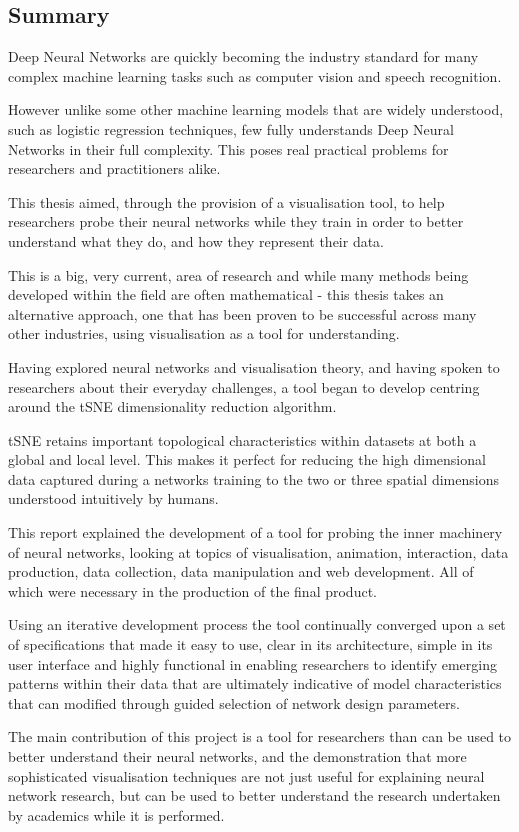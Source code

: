 \documentclass[a4paper,11pt,titlepage]{article}
\begin{document}
\subsection{Summary}
Deep Neural Networks are quickly becoming the industry standard for many complex machine learning tasks such as computer vision and speech recognition.
\par 
However unlike some other machine learning models that are widely understood, such as logistic regression techniques, few fully understands Deep Neural Networks in their full complexity. This poses real practical problems for researchers and practitioners alike.
\par 
This thesis aimed, through the provision of a visualisation tool, to help researchers probe their neural networks while they train in order to better understand what they do, and how they represent their data.
\par 
This is a big, very current, area of research and while many methods being developed within the field are often mathematical - this thesis takes an alternative approach, one that has been proven to be successful across many other industries, using visualisation as a tool for understanding.
\par 
Having explored neural networks and visualisation theory, and having spoken to researchers about their everyday challenges, a tool began to develop centring around the tSNE dimensionality reduction algorithm.
\par 
tSNE retains important topological characteristics within datasets at both a global and local level. This makes it perfect for reducing the high dimensional data captured during a networks training to the two or three spatial dimensions understood intuitively by humans. 
\par 
This report explained the development of a tool for probing the inner machinery of neural networks, looking at topics of visualisation, animation, interaction, data production, data collection, data manipulation and web development. All of which were necessary in the production of the final product.
\par 
Using an iterative development process the tool continually converged upon a set of specifications that made it easy to use, clear in its architecture, simple in its user interface and highly functional in enabling researchers to identify emerging patterns within their data that are ultimately indicative of model characteristics that can modified through guided selection of network design parameters.
\par 
The main contribution of this project is a tool for researchers than can be used to better understand their neural networks, and the demonstration that more sophisticated visualisation techniques are not just useful for explaining neural network research, but can be used to better understand the research undertaken by academics while it is performed.
\end{document}
